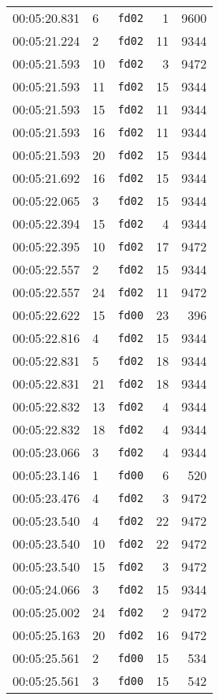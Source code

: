\documentclass{article}
\begin{document}
\begin{longtable}{lllrr}
00:05:20.831 & 6 & \texttt{fd02} & 1 & 9600 \\
00:05:21.224 & 2 & \texttt{fd02} & 11 & 9344 \\
00:05:21.593 & 10 & \texttt{fd02} & 3 & 9472 \\
00:05:21.593 & 11 & \texttt{fd02} & 15 & 9344 \\
00:05:21.593 & 15 & \texttt{fd02} & 11 & 9344 \\
00:05:21.593 & 16 & \texttt{fd02} & 11 & 9344 \\
00:05:21.593 & 20 & \texttt{fd02} & 15 & 9344 \\
00:05:21.692 & 16 & \texttt{fd02} & 15 & 9344 \\
00:05:22.065 & 3 & \texttt{fd02} & 15 & 9344 \\
00:05:22.394 & 15 & \texttt{fd02} & 4 & 9344 \\
00:05:22.395 & 10 & \texttt{fd02} & 17 & 9472 \\
00:05:22.557 & 2 & \texttt{fd02} & 15 & 9344 \\
00:05:22.557 & 24 & \texttt{fd02} & 11 & 9472 \\
00:05:22.622 & 15 & \texttt{fd00} & 23 & 396 \\
00:05:22.816 & 4 & \texttt{fd02} & 15 & 9344 \\
00:05:22.831 & 5 & \texttt{fd02} & 18 & 9344 \\
00:05:22.831 & 21 & \texttt{fd02} & 18 & 9344 \\
00:05:22.832 & 13 & \texttt{fd02} & 4 & 9344 \\
00:05:22.832 & 18 & \texttt{fd02} & 4 & 9344 \\
00:05:23.066 & 3 & \texttt{fd02} & 4 & 9344 \\
00:05:23.146 & 1 & \texttt{fd00} & 6 & 520 \\
00:05:23.476 & 4 & \texttt{fd02} & 3 & 9472 \\
00:05:23.540 & 4 & \texttt{fd02} & 22 & 9472 \\
00:05:23.540 & 10 & \texttt{fd02} & 22 & 9472 \\
00:05:23.540 & 15 & \texttt{fd02} & 3 & 9472 \\
00:05:24.066 & 3 & \texttt{fd02} & 15 & 9344 \\
00:05:25.002 & 24 & \texttt{fd02} & 2 & 9472 \\
00:05:25.163 & 20 & \texttt{fd02} & 16 & 9472 \\
00:05:25.561 & 2 & \texttt{fd00} & 15 & 534 \\
00:05:25.561 & 3 & \texttt{fd00} & 15 & 542 \\

\end{longtable}
\end{document}
